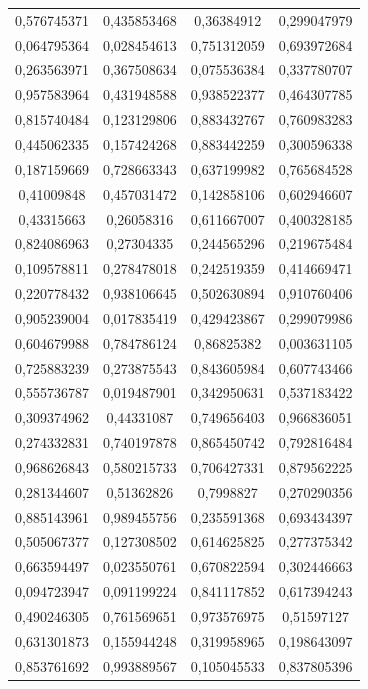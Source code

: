 \documentclass[a4paper,12pt]{article}
\begin{document}
\begin{longtable}{|c|c|c|c|}
0,576745371 & 0,435853468 & 0,36384912 & 0,299047979 \\ 
0,064795364 & 0,028454613 & 0,751312059 & 0,693972684 \\
0,263563971 & 0,367508634 & 0,075536384 & 0,337780707 \\
0,957583964 & 0,431948588 & 0,938522377 & 0,464307785 \\
0,815740484 & 0,123129806 & 0,883432767 & 0,760983283 \\
0,445062335 & 0,157424268 & 0,883442259 & 0,300596338 \\
0,187159669 & 0,728663343 & 0,637199982 & 0,765684528 \\
0,41009848 & 0,457031472 & 0,142858106 & 0,602946607 \\
0,43315663 & 0,26058316 & 0,611667007 & 0,400328185 \\
0,824086963 & 0,27304335 & 0,244565296 & 0,219675484 \\
0,109578811 & 0,278478018 & 0,242519359 & 0,414669471 \\
0,220778432 & 0,938106645 & 0,502630894 & 0,910760406 \\
0,905239004 & 0,017835419 & 0,429423867 & 0,299079986 \\
0,604679988 & 0,784786124 & 0,86825382 & 0,003631105 \\
0,725883239 & 0,273875543 & 0,843605984 & 0,607743466 \\
0,555736787 & 0,019487901 & 0,342950631 & 0,537183422 \\
0,309374962 & 0,44331087 & 0,749656403 & 0,966836051 \\
0,274332831 & 0,740197878 & 0,865450742 & 0,792816484 \\
0,968626843 & 0,580215733 & 0,706427331 & 0,879562225 \\
0,281344607 & 0,51362826 & 0,7998827 & 0,270290356 \\
0,885143961 & 0,989455756 & 0,235591368 & 0,693434397 \\
0,505067377 & 0,127308502 & 0,614625825 & 0,277375342 \\
0,663594497 & 0,023550761 & 0,670822594 & 0,302446663 \\
0,094723947 & 0,091199224 & 0,841117852 & 0,617394243 \\
0,490246305 & 0,761569651 & 0,973576975 & 0,51597127 \\
0,631301873 & 0,155944248 & 0,319958965 & 0,198643097 \\
0,853761692 & 0,993889567 & 0,105045533 & 0,837805396 \\

\end{longtable}
\end{document}

